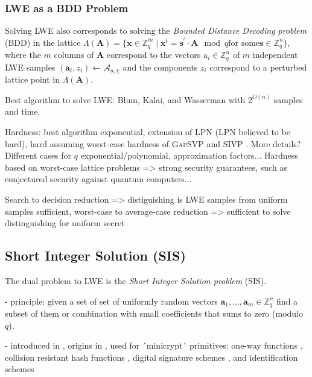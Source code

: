 \documentclass[
  a4paper,  %
  twoside,  %
  bibliography=totoc,
  headsepline,
  cleardoublepage=empty,
  parskip=half,
  draft=false
]{scrbook}
\begin{document}

\subsubsection{LWE as a BDD Problem} %
Solving LWE also corresponds to solving the \textit{Bounded Distance Decoding problem} (BDD) in the lattice $\Lambda(\textbf{A}) = \{ \textbf{x} \in \mathbb{Z}_q^m \mid \textbf{x}^t = \textbf{s}^^t \cdot \textbf{A} \mod q \text{for some} \textbf{s} \in \mathbb{Z}_q^n\}$, where the $m$ columns of $\textbf{A}$ correspond to the vectors $\text{a}_i \in \mathbb{Z}_q^n$ of $m$ independent LWE samples $(\textbf{a}_i, z_i) \leftarrow \mathcal{A}_{\textbf{s}, \chi}$ and the components $z_i$ correspond to a perturbed lattice point in $\Lambda(\textbf{A})$. 



Best algorithm to solve LWE: Blum, Kalai, and Wasserman \cite{BKW03} with $2^{O(n)}$ samples and time. %

Hardness: best algorithm exponential, extension of LPN (LPN believed to be hard), hard assuming worst-case hardness of \textsc{GapSVP} %
and \textsc{SIVP} \cite{Reg05, Pei09}. More details? Different cases for $q$ exponential/polynomial, approximation factors...
Hardness based on worst-case lattice problems => strong security guarantees, such as conjectured security against quantum computers...
 
Search to decision reduction => distiguishing is LWE samples from uniform samples sufficient, worst-case to average-case reduction => sufficient to solve distinguishing for uniform secret

\subsection{Short Integer Solution (SIS)}
The dual problem to LWE is the \textit{Short Integer Solution problem} (SIS).

- principle: given a set of set of uniformly random vectors $\textbf{a}_1, \ldots, \textbf{a}_m \in \mathbb{Z}_q^n$ find a subset of them or combination with small coefficients that sums to zero (modulo $q$). %

- introduced in \cite{MR04}, origins in \cite{Atj96}, used for ´minicrypt´ primitives: one-way functions \cite{Atj96}, collision resistant hash functions \cite{GGH96}, digital signature schemes \cite{GPV08, CHKP10}, and identification schemes \cite{MV03, Lyu08, KTX07} %
\end{document}
